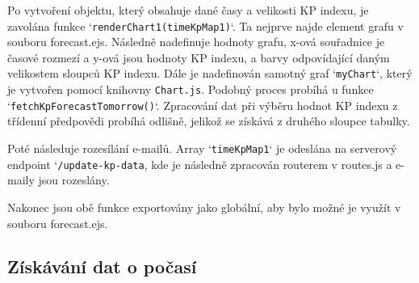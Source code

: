 \par Po vytvoření objektu, který obsahuje dané časy a velikosti KP indexu, je zavolána funkce `\texttt{renderChart1(timeKpMap1)}`. Ta nejprve najde element grafu v souboru forecast.ejs. Následně nadefinuje hodnoty grafu, x-ová souřadnice je časové rozmezí a y-ová jsou hodnoty KP indexu, a barvy odpovídající daným velikostem sloupců KP indexu. Dále je nadefinován samotný graf `\texttt{myChart}`, který je vytvořen pomocí knihovny \texttt{Chart.js}\cite{chartjs_bar}\cite{chartjs_legend}\cite{chartjs_tutorial}. Podobný proces probíhá u funkce `\texttt{fetchKpForecastTomorrow()}`. Zpracování dat při výběru hodnot KP indexu z třídenní předpovědi probíhá odlišně, jelikož se získává z druhého sloupce tabulky. 
\par Poté následuje rozesílání e-mailů. Array `\texttt{timeKpMap1}` je odeslána na serverový endpoint `\texttt{/update-kp-data}, kde je následně zpracován routerem v routes.js a e-maily jsou rozeslány. 
\par Nakonec jsou obě funkce exportovány jako globální, aby bylo možné je využít v souboru forecast.ejs.


\subsection{Získávání dat o počasí}

